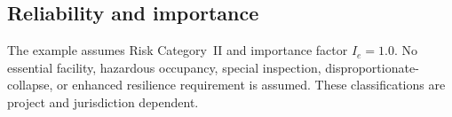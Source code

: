 \subsection{Reliability and importance}
The example assumes Risk Category~II and importance factor $I_e=1.0$. No essential
facility, hazardous occupancy, special inspection, disproportionate-collapse, or
enhanced resilience requirement is assumed. These classifications are project and
jurisdiction dependent.


